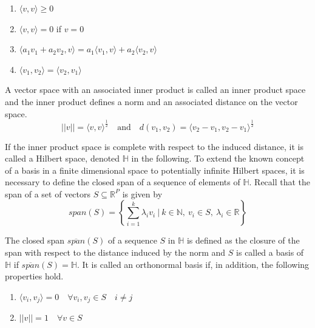 \documentclass[11pt,twoside,a4paper]{article}
\begin{document}
	\begin{multicols}{2}
		\begin{enumerate}
			\item $\langle v, v \rangle \geq 0$
			\item $\langle v, v \rangle = 0$ if $v = 0$
			\item $\langle a_1 v_1 + a_2 v_2, v \rangle = a_1 \langle v_1, v \rangle + a_2 \langle v_2, v \rangle$
			\item $\langle v_1, v_2 \rangle = \langle v_2, v_1 \rangle$
		\end{enumerate}
	\end{multicols}

	A vector space with an associated inner product is called an inner product space and the inner product defines a norm and an associated distance on the vector space.
	\begin{equation}
		\lvert \lvert v \rvert \rvert = {\langle v, v \rangle}^{\frac{1}{2}} \quad \text{and} \quad 
		d(v_1, v_2) = {\langle v_2 - v_1, v_2 - v_1 \rangle}^{\frac{1}{2}}
	\end{equation}
	
	If the inner product space is complete with respect to the induced distance, it is called a Hilbert space, denoted $\mathbb{H}$ in the following. To extend the known concept of a basis in a finite dimensional space to potentially infinite Hilbert spaces, it is necessary to define the closed span of a sequence of elements of $\mathbb{H}$. Recall that the span of a set of vectors $S \subseteq \mathbb{R}^P$ is given by
	\begin{equation}
		span(S) = \left\{\sum_{i = 1}^{k} \lambda_i v_i \: \bigg\vert \: k \in \mathbb{N}, \: v_i \in S, \: \lambda_i \in \mathbb{R} \right\}
	\end{equation}
			
	The closed span $\overline{span}(S)$ of a sequence $S$ in $\mathbb{H}$ is defined as the closure of the span with respect to the distance induced by the norm and $S$ is called a basis of $\mathbb{H}$ if $\overline{span}(S) = \mathbb{H}$.	It is called an orthonormal basis if, in addition, the following properties hold. 
	
	\begin{multicols}{2}
		\begin{enumerate}
			\item $\langle v_i, v_j \rangle = 0 \quad \forall v_i, v_j \in S \quad i \neq j$
			\item $\lvert \lvert v \rvert \rvert = 1 \quad \forall v \in S$
		\end{enumerate}
	\end{multicols}
\end{document}
